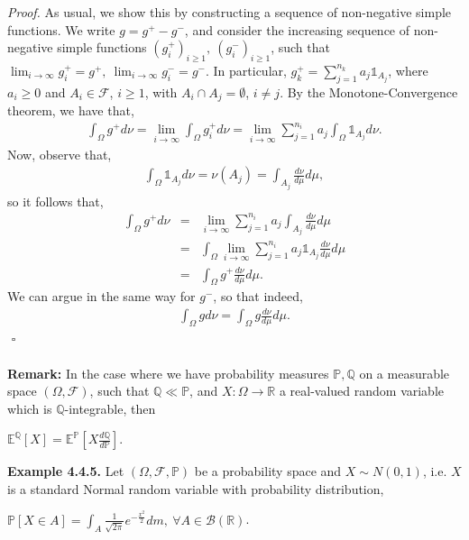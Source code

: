 \documentclass{article}
\begin{document}
\textit{Proof.} As usual, we show this by constructing a sequence of non-negative simple functions. We write $g = g^+ - g^-$, and consider the increasing sequence of non-negative simple functions $(g_i^+)_{i\geq1}, \ (g_i^-)_{i\geq1}$, such that $\lim_{i\to\infty}g_i^+ = g^+, \ \lim_{i\to\infty}g_i^- = g^-$. In particular, $g_k^+ = \sum_{j=1}^{n_k}a_j\mathds{1}_{A_j}$, where $a_i\geq0$ and $A_i\in\mathcal{F}$, $i\geq1$, with $A_i \cap A_j = \emptyset$, $i \neq j$. By the Monotone-Convergence theorem, we have that,
\begin{eqnarray}
\nonumber
\int_\Omega g^+ d\nu = \lim_{i\to\infty} \int_\Omega g_i^+ d\nu = \lim_{i\to\infty} \sum_{j=1}^{n_i}a_j \int_\Omega \mathds{1}_{A_j} d\nu.
\end{eqnarray}
Now, observe that,
\begin{eqnarray}
\nonumber
\int_\Omega \mathds{1}_{A_j} d\nu = \nu(A_j) = \int_{A_j} \frac{d\nu}{d\mu} d\mu,
\end{eqnarray}
so it follows that,
\begin{eqnarray}
\nonumber
\int_\Omega g^+ d\nu &=& \lim_{i\to\infty}\sum_{j=1}^{n_i}a_j \int_{A_j} \frac{d\nu}{d\mu} d\mu\\
\nonumber
&=& \int_\Omega \lim_{i\to\infty}\sum_{j=1}^{n_i}a_j \mathds{1}_{A_j} \frac{d\nu}{d\mu} d\mu\\
\nonumber
&=& \int_\Omega g^+ \frac{d\nu}{d\mu} d\mu.
\end{eqnarray}
We can argue in the same way for $g^-$, so that indeed,
\begin{eqnarray}
\nonumber
\int_\Omega g d\nu = \int_\Omega g \frac{d\nu}{d\mu} d\mu.
\end{eqnarray}
${}$ \hfill $\square$ \\\\
\textbf{Remark:} In the case where we have probability measures $\mathbb{P},\mathbb{Q}$ on a measurable space $(\Omega,\mathcal{F})$, such that $\mathbb{Q}\ll\mathbb{P}$, and $X:\Omega\to\mathbb{R}$ a real-valued random variable which is $\mathbb{Q}$-integrable, then
\begin{center}
	$\mathbb{E}^{\mathbb{Q}}[X] = \mathbb{E}^{\mathbb{P}}\left[X\frac{d\mathbb{Q}}{d\mathbb{P}}\right]$.
\end{center}
\textbf{Example 4.4.5.} Let $(\Omega,\mathcal{F},\mathbb{P})$ be a probability space and $X \sim N(0,1)$, i.e. $X$ is a standard Normal random variable with probability distribution,
\begin{center}
	$\mathbb{P}[X \in A] = \int_A \frac{1}{\sqrt{2\pi}} e^{-\frac{x^2}{2}} dm, \ \forall A \in \mathcal{B}({\mathbb{R}})$.
\end{center}
\end{document}
